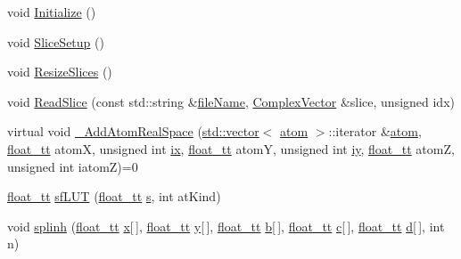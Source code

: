 \begin{DoxyCompactItemize}
\item 
void \hyperlink{class_q_s_t_e_m_1_1_c_potential_ad6ed270567bcf590b33a5736a4aa8fc1}{Initialize} ()
\item 
void \hyperlink{class_q_s_t_e_m_1_1_c_potential_a9858c6b5b383fd370a0862a1ba1bc0c8}{Slice\-Setup} ()
\item 
void \hyperlink{class_q_s_t_e_m_1_1_c_potential_ac038d52b6e988cbbd917f54078249b9c}{Resize\-Slices} ()
\item 
void \hyperlink{class_q_s_t_e_m_1_1_c_potential_aed049fef3c601fd3b89ef4ff4389ae23}{Read\-Slice} (const std\-::string \&\hyperlink{qmb_8m_a7a230f02bdffebd1357e3c0b49e01271}{file\-Name}, \hyperlink{namespace_q_s_t_e_m_af210a2c1f9afae1deed746dcd9276221}{Complex\-Vector} \&slice, unsigned idx)
\item 
virtual void \hyperlink{class_q_s_t_e_m_1_1_c_potential_acfcb1793302bdd08e5bd362a7eb6f1dd}{\-\_\-\-Add\-Atom\-Real\-Space} (\hyperlink{qmb_8m_af54b69a32590de218622e869b06b47b3}{std\-::vector}$<$ \hyperlink{namespace_q_s_t_e_m_a402dabc31a7a1fe906d0cdd138c69686}{atom} $>$\-::iterator \&\hyperlink{namespace_q_s_t_e_m_a402dabc31a7a1fe906d0cdd138c69686}{atom}, \hyperlink{namespace_q_s_t_e_m_a915d7caa497280d9f927c4ce8d330e47}{float\-\_\-tt} atom\-X, unsigned int \hyperlink{_display_model_properties_8m_a76b405b72b88bde9488209ac06ddb714}{ix}, \hyperlink{namespace_q_s_t_e_m_a915d7caa497280d9f927c4ce8d330e47}{float\-\_\-tt} atom\-Y, unsigned int \hyperlink{_display_model_properties_8m_af4c5cec9fce175f73b7da5ecd33c2af6}{iy}, \hyperlink{namespace_q_s_t_e_m_a915d7caa497280d9f927c4ce8d330e47}{float\-\_\-tt} atom\-Z, unsigned int iatom\-Z)=0
\item 
\hyperlink{namespace_q_s_t_e_m_a915d7caa497280d9f927c4ce8d330e47}{float\-\_\-tt} \hyperlink{class_q_s_t_e_m_1_1_c_potential_ace34562524fddea327c00ee56cde6c81}{sf\-L\-U\-T} (\hyperlink{namespace_q_s_t_e_m_a915d7caa497280d9f927c4ce8d330e47}{float\-\_\-tt} \hyperlink{aberrations___t_e_m_8m_aef29541a06b7f933d32a804307db13af}{s}, int at\-Kind)
\item 
void \hyperlink{class_q_s_t_e_m_1_1_c_potential_a53acdbafdf8087fdf93fdd634973b382}{splinh} (\hyperlink{namespace_q_s_t_e_m_a915d7caa497280d9f927c4ce8d330e47}{float\-\_\-tt} \hyperlink{_read_d_m3___matlab_8m_a9336ebf25087d91c818ee6e9ec29f8c1}{x}\mbox{[}$\,$\mbox{]}, \hyperlink{namespace_q_s_t_e_m_a915d7caa497280d9f927c4ce8d330e47}{float\-\_\-tt} \hyperlink{qmb_8m_a2fb1c5cf58867b5bbc9a1b145a86f3a0}{y}\mbox{[}$\,$\mbox{]}, \hyperlink{namespace_q_s_t_e_m_a915d7caa497280d9f927c4ce8d330e47}{float\-\_\-tt} \hyperlink{xyz2cfg_8m_a21ad0bd836b90d08f4cf640b4c298e7c}{b}\mbox{[}$\,$\mbox{]}, \hyperlink{namespace_q_s_t_e_m_a915d7caa497280d9f927c4ce8d330e47}{float\-\_\-tt} \hyperlink{image_sim_8m_a463b16ca2bfa2f0cbab0e62fcb263d8e}{c}\mbox{[}$\,$\mbox{]}, \hyperlink{namespace_q_s_t_e_m_a915d7caa497280d9f927c4ce8d330e47}{float\-\_\-tt} \hyperlink{_read_d_m3___matlab_8m_a1aabac6d068eef6a7bad3fdf50a05cc8}{d}\mbox{[}$\,$\mbox{]}, int n)

\end{DoxyCompactItemize}
